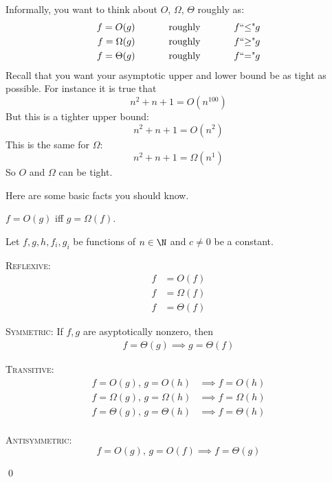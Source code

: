 Informally, you want to think about $O$, $\Omega$, $\Theta$ roughly as:
\begin{align*}
f = O(g)      &\text{ \hspace{1cm} roughly \hspace{1cm} } f \text{\lq\lq$\leq$"} g \\
f = \Omega(g) &\text{ \hspace{1cm} roughly \hspace{1cm} } f \text{\lq\lq$\geq$"} g \\
f = \Theta(g) &\text{ \hspace{1cm} roughly \hspace{1cm} } f \text{\lq\lq$=$"} g
\end{align*}
Recall that you want your asymptotic upper and lower bound be as tight as
possible.
For instance it is true that
\[
n^2 + n + 1 = O(n^{100})
\]
But this is a tighter upper bound:
\[
n^2 + n + 1 = O(n^{2})
\]
This is the same for $\Omega$:
\[
n^2 + n + 1 = \Omega(n^1)
\]
So $O$ and $\Omega$ can be tight.

Here are some basic facts you should know.

\begin{prop}
  $f = O(g)$ iff $g = \Omega(f)$.
\end{prop}

\begin{prop}
  Let $f, g, h, f_i, g_i$ be functions of $n \in \N$ and $c \neq 0$ be a constant.
  \begin{myenum}
  \item
    \textsc{Reflexive:}
    \begin{align*}
    f &= O(f) \\
    f &= \Omega(f) \\
    f &= \Theta(f) 
    \end{align*}
  \item
    \textsc{Symmetric:}
    If $f,g$ are asyptotically nonzero, then
    \begin{align*}
    f = \Theta(g) \implies g = \Theta(f)
    \end{align*}  
  \item
    \textsc{Transitive:}
    \begin{align*}
    f = O(g) \text{, } g = O(h) &\implies f = O(h) \\
    f = \Omega(g) \text{, } g = \Omega(h) &\implies f = \Omega(h) \\
    f = \Theta(g) \text{, } g = \Theta(h) &\implies f = \Theta(h) \\
    \end{align*}
  \item
    \textsc{Antisymmetric:}
    \[
    f = O(g) \text{, } g = O(f) \implies f = \Theta(g)
    \]
  \end{myenum}
  \qed
\end{prop}

